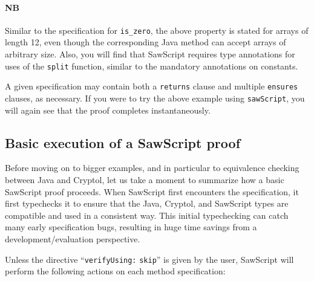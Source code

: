 \documentclass[12pt]{galois-whitepaper}
\newcommand{\sawScript}{{\sc SawScript}\xspace}
\begin{document}
\paragraph{NB} Similar to the specification for {\tt is\_zero}, the above property is stated for arrays of length
12, even though the corresponding Java method can accept
arrays of arbitrary size. Also, you will find that \sawScript requires type annotations for uses of the {\tt split} function, similar to the
mandatory annotations on constants.

A given specification may contain both a {\tt returns} clause and multiple {\tt ensures} clauses, as necessary. If you were to try the
above example using {\tt sawScript}, you will again see that the proof completes instantaneously.

\subsection{Basic execution of a \sawScript proof}\label{sec:proofexec}

Before moving on to bigger examples, and in particular to equivalence checking
between Java and Cryptol, let us take a moment to summarize how a basic
\sawScript proof proceeds. 
When \sawScript first encounters the specification, it first typechecks it
to ensure that the Java, Cryptol, and \sawScript types are compatible and
used in a consistent way.  This initial typechecking can catch many early
specification bugs, resulting in huge time savings from a development/evaluation perspective.

Unless the directive ``{\tt verifyUsing:} {\tt skip}'' is given by the user, \sawScript will perform the following actions
on each method specification:
\end{document}

